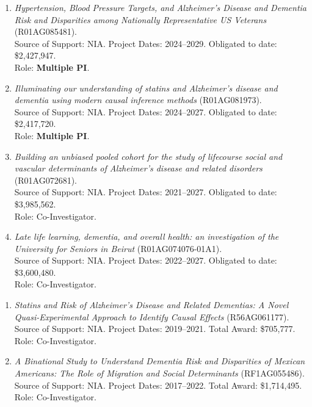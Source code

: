 \documentclass[11pt]{article}
\newcommand{\subhead}[1]{\Needspace{5\baselineskip}\vspace{7pt}{\sffamily\footnotesize\bfseries\color{ink}#1}\par\vspace{1pt}}
\begin{document}
\begin{enumerate}[leftmargin=*]

\item \emph{Hypertension, Blood Pressure Targets, and Alzheimer's Disease and Dementia Risk and Disparities among Nationally Representative US Veterans} (R01AG085481).\\
Source of Support: NIA. Project Dates: 2024--2029.
Obligated to date: \$2,427,947.\\
Role: \textbf{Multiple PI}.

\item \emph{Illuminating our understanding of statins and Alzheimer's disease and dementia using modern causal inference methods} (R01AG081973).\\
Source of Support: NIA. Project Dates: 2024--2027.
Obligated to date: \$2,417,720.\\
Role: \textbf{Multiple PI}.

\item \emph{Building an unbiased pooled cohort for the study of lifecourse social and vascular determinants of Alzheimer's disease and related disorders} (R01AG072681).\\
Source of Support: NIA.
Project Dates: 2021--2027.
Obligated to date: \$3,985,562.\\
Role: Co-Investigator.

\item \emph{Late life learning, dementia, and overall health: an investigation of the University for Seniors in Beirut} (R01AG074076-01A1).\\
Source of Support: NIA.
Project Dates: 2022--2027.
Obligated to date: \$3,600,480.\\
Role: Co-Investigator.
\end{enumerate}


\noindent\subhead{Completed}

\begin{enumerate}[resume, leftmargin=*]
\item \emph{Statins and Risk of Alzheimer's Disease and Related Dementias: A Novel Quasi-Experimental Approach to Identify Causal Effects} (R56AG061177).\\
Source of Support: NIA.
Project Dates: 2019--2021.
Total Award: \$705,777.\\
Role: Co-Investigator.

\item \emph{A Binational Study to Understand Dementia Risk and Disparities of Mexican Americans: The Role of Migration and Social Determinants} (RF1AG055486).\\
Source of Support: NIA.
Project Dates: 2017--2022.
Total Award: \$1,714,495.\\
Role: Co-Investigator.
\end{enumerate}
\end{document}

